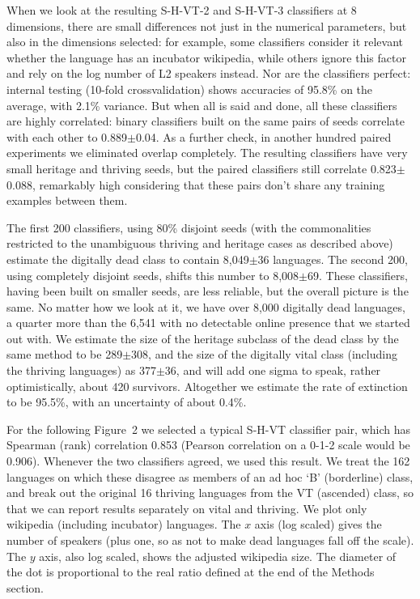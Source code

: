 \documentclass[10pt]{article}
\begin{document}
When we look at the resulting S-H-VT-2 and S-H-VT-3 classifiers at 8
dimensions, there are small differences not just in the numerical parameters,
but also in the dimensions selected: for example, some classifiers consider it
relevant whether the language has an incubator wikipedia, while others ignore
this factor and rely on the log number of L2 speakers instead. Nor are the
classifiers perfect: internal testing (10-fold crossvalidation) shows
accuracies of 95.8\% on the average, with 2.1\% variance. But when all is said
and done, all these classifiers are highly correlated: binary classifiers
built on the same pairs of seeds correlate with each other to 0.889$\pm$0.04.
As a further check, in another hundred paired experiments we eliminated
overlap completely. The resulting classifiers have very small heritage and 
thriving seeds, but the paired classifiers still correlate 0.823$\pm$0.088,
remarkably high considering that these pairs don't share any training examples
between them.

The first 200 classifiers, using 80\% disjoint seeds (with the commonalities
restricted to the unambiguous thriving and heritage cases as described above)
estimate the digitally dead class to contain 8,049$\pm$36 languages. The
second 200, using completely disjoint seeds, shifts this number to
8,008$\pm$69.  These classifiers, having been built on smaller seeds, are less
reliable, but the overall picture is the same. No matter how we look at it, we
have over 8,000 digitally dead languages, a quarter more than the 6,541 with
no detectable online presence that we started out with.  We estimate the size
of the heritage subclass of the dead class by the same method to be
289$\pm$308, and the size of the digitally vital class (including the
thriving languages) as 377$\pm$36, and will add one sigma to speak, rather
optimistically, about 420 survivors.  Altogether we estimate the rate of
extinction to be 95.5\%, with an uncertainty of about 0.4\%.

For the following Figure~2 we selected a typical S-H-VT classifier pair, which
has Spearman (rank) correlation 0.853 (Pearson correlation on a 0-1-2 scale
would be 0.906). Whenever the two classifiers agreed, we used this result.  We
treat the 162 languages on which these disagree as members of an ad hoc `B'
(borderline) class, and break out the original 16 thriving languages from the
VT (ascended) class, so that we can report results separately on vital and
thriving. We plot only wikipedia (including incubator) languages. The $x$ axis
(log scaled) gives the number of speakers (plus one, so as not to make dead
languages fall off the scale). The $y$ axis, also log scaled, shows the
adjusted wikipedia size. The diameter of the dot is proportional to the real
ratio defined at the end of the Methods section.
\end{document}
